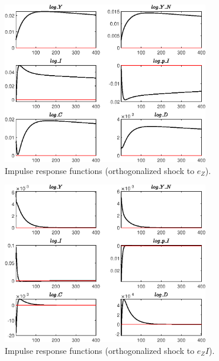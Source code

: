  
\begin{figure}[H]
\centering 
\includegraphics[width=0.80\textwidth]{BRS_fd/graphs/BRS_fd_IRF_e_Z}
\caption{Impulse response functions (orthogonalized shock to ${e_Z}$).}
\label{Fig:IRF:e_Z}
\end{figure}
 
\begin{figure}[H]
\centering 
\includegraphics[width=0.80\textwidth]{BRS_fd/graphs/BRS_fd_IRF_e_ZI}
\caption{Impulse response functions (orthogonalized shock to ${e_ZI}$).}
\label{Fig:IRF:e_ZI}
\end{figure}
 
